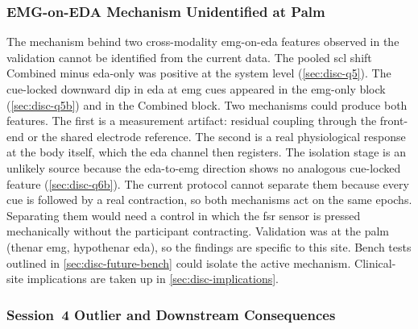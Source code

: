 \subsubsection{EMG-on-EDA Mechanism Unidentified at Palm}
\label{sec:disc-lim-mechanism}

The mechanism behind two cross-modality \gls{emg}-on-\gls{eda} features observed in the validation cannot be identified from the current data. The pooled \gls{scl} shift Combined minus \gls{eda}-only was positive at the system level (\autoref{sec:disc-q5}). The cue-locked downward dip in \gls{eda} at \gls{emg} cues appeared in the \gls{emg}-only block (\autoref{sec:disc-q5b}) and in the Combined block. Two mechanisms could produce both features. The first is a measurement artifact: residual coupling through the front-end or the shared electrode reference. The second is a real physiological response at the body itself, which the \gls{eda} channel then registers. The isolation stage is an unlikely source because the \gls{eda}-to-\gls{emg} direction shows no analogous cue-locked feature (\autoref{sec:disc-q6b}). The current protocol cannot separate them because every cue is followed by a real contraction, so both mechanisms act on the same epochs. Separating them would need a control in which the \gls{fsr} sensor is pressed mechanically without the participant contracting. Validation was at the palm (thenar \gls{emg}, hypothenar \gls{eda}), so the findings are specific to this site. Bench tests outlined in \autoref{sec:disc-future-bench} could isolate the active mechanism. Clinical-site implications are taken up in \autoref{sec:disc-implications}.


\subsubsection{Session~4 Outlier and Downstream Consequences}
\label{sec:disc-lim-s4}

